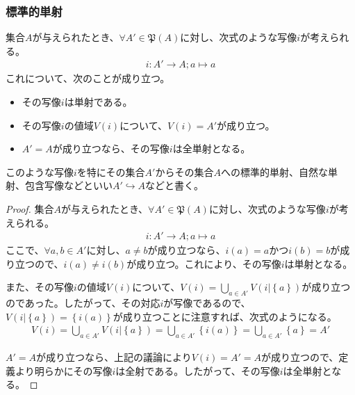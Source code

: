 \documentclass[dvipdfmx]{jsarticle}
\begin{document}
\subsubsection{標準的単射}%
\begin{thm}
\label{1.2.3.11}
集合$A$が与えられたとき、$\forall A'\in \mathfrak{P}(A)$に対し、次式のような写像$i$が考えられる。
\begin{align*}
i:A' \rightarrow A;a \mapsto a
\end{align*}
これについて、次のことが成り立つ。
\begin{itemize}
\item
  その写像$i$は単射である。
\item
  その写像$i$の値域$V(i)$について、$V(i) = A'$が成り立つ。
\item
  $A' = A$が成り立つなら、その写像$i$は全単射となる。
\end{itemize}
\end{thm}
\begin{dfn}
このような写像$i$を特にその集合$A'$からその集合$A$への標準的単射、自然な単射、包含写像などといい$A' \hookrightarrow A$などと書く。
\end{dfn}
\begin{proof}
集合$A$が与えられたとき、$\forall A'\in \mathfrak{P}(A)$に対し、次式のような写像$i$が考えられる。
\begin{align*}
i:A' \rightarrow A;a \mapsto a
\end{align*}
ここで、$\forall a,b \in A'$に対し、$a \neq b$が成り立つなら、$i(a) = a$かつ$i(b) = b$が成り立つので、$i(a) \neq i(b)$が成り立つ。これにより、その写像$i$は単射となる。\par
また、その写像$i$の値域$V(i)$について、$V(i) = \bigcup_{a \in A'} {V\left( i|\left\{ a \right\} \right)}$が成り立つのであった。したがって、その対応$i$が写像であるので、$V\left( i|\left\{ a \right\} \right) = \left\{ i(a) \right\}$が成り立つことに注意すれば、次式のようになる。
\begin{align*}
V(i) = \bigcup_{a \in A'} {V\left( i|\left\{ a \right\} \right)} = \bigcup_{a \in A'} \left\{ i(a) \right\} = \bigcup_{a \in A'} \left\{ a \right\} = A'
\end{align*}\par
$A' = A$が成り立つなら、上記の議論により$V(i) = A' = A$が成り立つので、定義より明らかにその写像$i$は全射である。したがって、その写像$i$は全単射となる。
\end{proof}
\end{document}
